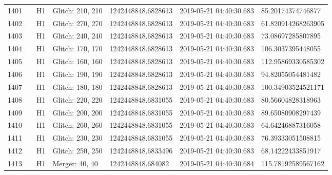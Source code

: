 \begin{longtable}{lllllll}
1401 &                                                    &       H1 &  Glitch: 210, 210 &  1242448848.6828613 &  2019-05-21 04:40:30.683 &   85.20174374746877 \\
1402 &                                                    &       H1 &  Glitch: 270, 270 &  1242448848.6828613 &  2019-05-21 04:40:30.683 &  61.820914268263905 \\
1403 &                                                    &       H1 &  Glitch: 240, 240 &  1242448848.6828613 &  2019-05-21 04:40:30.683 &   73.08697285807895 \\
1404 &                                                    &       H1 &  Glitch: 170, 170 &  1242448848.6828613 &  2019-05-21 04:40:30.683 &   106.3037395448055 \\
1405 &                                                    &       H1 &  Glitch: 160, 160 &  1242448848.6828613 &  2019-05-21 04:40:30.683 &  112.95869330585302 \\
1406 &                                                    &       H1 &  Glitch: 190, 190 &  1242448848.6828613 &  2019-05-21 04:40:30.683 &   94.82055054481482 \\
1407 &                                                    &       H1 &  Glitch: 180, 180 &  1242448848.6828613 &  2019-05-21 04:40:30.683 &  100.34903524521171 \\
1408 &                                                    &       H1 &  Glitch: 220, 220 &  1242448848.6831055 &  2019-05-21 04:40:30.683 &   80.56604828318963 \\
1409 &                                                    &       H1 &  Glitch: 200, 200 &  1242448848.6831055 &  2019-05-21 04:40:30.683 &   89.65080908297439 \\
1410 &                                                    &       H1 &  Glitch: 260, 260 &  1242448848.6831055 &  2019-05-21 04:40:30.683 &   64.64246887316058 \\
1411 &                                                    &       H1 &  Glitch: 230, 230 &  1242448848.6831055 &  2019-05-21 04:40:30.683 &   76.39333051508815 \\
1412 &                                                    &       H1 &  Glitch: 250, 250 &  1242448848.6833496 &  2019-05-21 04:40:30.683 &   68.14222433851917 \\
1413 &                                                    &       H1 &    Merger: 40, 40 &   1242448848.684082 &  2019-05-21 04:40:30.684 &  115.78192589567162 \\

\end{longtable}
